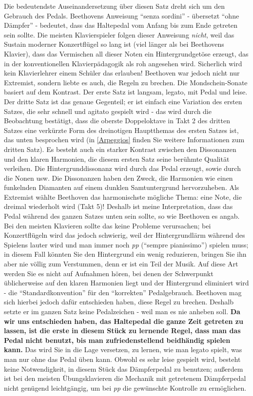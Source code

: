 Die bedeutendste Auseinandersetzung über diesen Satz dreht sich um den Gebrauch des Pedals.
Beethovens Anweisung \enquote{senza sordini} - übersetzt \enquote{ohne Dämpfer} - bedeutet, dass das Haltepedal vom Anfang bis zum Ende getreten sein sollte.
Die meisten Klavierspieler folgen dieser Anweisung \textit{nicht}, weil das Sustain moderner Konzertflügel so lang ist (viel länger als bei Beethovens Klavier), dass das Vermischen all dieser Noten ein Hintergrundgetöse erzeugt, das in der konventionellen Klavierpädagogik als roh angesehen wird.
Sicherlich wird kein Klavierlehrer einem Schüler das erlauben!
Beethoven war jedoch nicht nur Extremist, sondern liebte es auch, die Regeln zu brechen.
Die Mondschein-Sonate basiert auf dem Kontrast.
Der erste Satz ist langsam, legato, mit Pedal und leise.
Der dritte Satz ist das genaue Gegenteil; er ist einfach eine Variation des ersten Satzes, die sehr schnell und agitato gespielt wird - das wird durch die Beobachtung bestätigt, dass die oberste Doppeloktave in Takt 2 des dritten Satzes eine verkürzte Form des dreinotigen Hauptthemas des ersten Satzes ist, das unten besprochen wird (in \hyperref[Arpeggios]{\ref*{Arpeggios}} finden Sie weitere Informationen zum dritten Satz).
Es besteht auch ein starker Kontrast zwischen den Dissonanzen und den klaren Harmonien, die diesem ersten Satz seine berühmte Qualität verleihen.
Die Hintergrunddissonanz wird durch das Pedal erzeugt, sowie durch die Nonen usw.
Die Dissonanzen haben den Zweck, die Harmonien wie einen funkelnden Diamanten auf einem dunklen Samtuntergrund hervorzuheben.
Als Extremist wählte Beethoven das harmonischste mögliche Thema: eine Note, die dreimal wiederholt wird (Takt 5)!
Deshalb ist meine Interpretation, dass das Pedal während des ganzen Satzes unten sein sollte, so wie Beethoven es angab.
Bei den meisten Klavieren sollte das keine Probleme verursachen;
bei Konzertflügeln wird das jedoch schwierig, weil der Hintergrundlärm während des Spielens lauter wird und man immer noch \textit{pp} (\enquote{sempre pianissimo}) spielen muss; in diesem Fall könnten Sie den Hintergrund ein wenig reduzieren, bringen Sie ihn aber nie völlig zum Verstummen, denn er ist ein Teil der Musik.
Auf diese Art werden Sie es nicht auf Aufnahmen hören, bei denen der Schwerpunkt üblicherweise auf den klaren Harmonien liegt und der Hintergrund eliminiert wird - die \enquote{Standardkonvention} für den \enquote{korrekten} Pedalgebrauch.
Beethoven mag sich hierbei jedoch dafür entschieden haben, diese Regel zu brechen.
Deshalb setzte er im ganzen Satz keine Pedalzeichen - weil man es nie anheben soll.
\textbf{Da wir uns entschieden haben, das Haltepedal die ganze Zeit getreten zu lassen, ist die erste in diesem Stück zu lernende Regel, dass man das Pedal nicht benutzt, bis man zufriedenstellend beidhändig spielen kann.}
Das wird Sie in die Lage versetzen, zu lernen, wie man legato spielt, was man nur ohne das Pedal üben kann.
Obwohl es sehr leise gespielt wird, besteht keine Notwendigkeit, in diesem Stück das Dämpferpedal zu benutzen; außerdem ist bei den meisten Übungsklavieren die Mechanik mit getretenem Dämpferpedal nicht genügend leichtgängig, um bei \textit{pp} die gewünschte Kontrolle zu ermöglichen.

